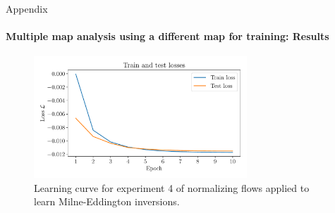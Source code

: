 \documentclass{beamer}
\begin{document}
\begin{frame}[allowframebreaks]{Appendix}
	\framesubtitle{Multiple map analysis using a different map for training: Results} %
	\begin{figure}[h]
		\centering
		\includegraphics[width=8cm]{figures/thesis/nf-milne-eddington-example-4-loss-nflows-piecewisequadratic.pdf}
		\caption{Learning curve for experiment 4 of normalizing flows applied to learn Milne-Eddington inversions.}
		\label{fig:nf-milne-eddington-example-4-loss-nflows-piecewisequadratic}
	\end{figure}
\end{frame}
\end{document}
